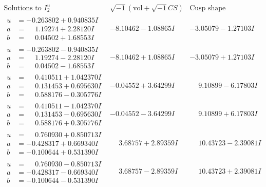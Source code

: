 \documentclass[1p]{elsarticle_modified}
\theoremstyle{definition}
\newcommand{\I}{\sqrt{-1}}
\begin{document}
$$\begin{array}{c|c|c}  
\text{Solutions to }I^u_{2}& \I (\text{vol} + \sqrt{-1}CS) & \text{Cusp shape}\\
 \hline 
\begin{aligned}
u &= -0.263802 + 0.940835 I \\
a &= \phantom{-}1.19274 + 2.28120 I \\
b &= \phantom{-}0.04502 + 1.68553 I\end{aligned}
 & -8.10462 - 1.08865 I & -3.05079 - 1.27103 I \\ \hline\begin{aligned}
u &= -0.263802 - 0.940835 I \\
a &= \phantom{-}1.19274 - 2.28120 I \\
b &= \phantom{-}0.04502 - 1.68553 I\end{aligned}
 & -8.10462 + 1.08865 I & -3.05079 + 1.27103 I \\ \hline\begin{aligned}
u &= \phantom{-}0.410511 + 1.042370 I \\
a &= \phantom{-}0.131453 + 0.695630 I \\
b &= \phantom{-}0.588176 - 0.305776 I\end{aligned}
 & -0.04552 + 3.64299 I & \phantom{-}9.10899 - 6.17803 I \\ \hline\begin{aligned}
u &= \phantom{-}0.410511 - 1.042370 I \\
a &= \phantom{-}0.131453 - 0.695630 I \\
b &= \phantom{-}0.588176 + 0.305776 I\end{aligned}
 & -0.04552 - 3.64299 I & \phantom{-}9.10899 + 6.17803 I \\ \hline\begin{aligned}
u &= \phantom{-}0.760930 + 0.850713 I \\
a &= -0.428317 + 0.669340 I \\
b &= -0.100644 + 0.531390 I\end{aligned}
 & \phantom{-}3.68757 + 2.89359 I & \phantom{-}10.43723 - 2.39081 I \\ \hline\begin{aligned}
u &= \phantom{-}0.760930 - 0.850713 I \\
a &= -0.428317 - 0.669340 I \\
b &= -0.100644 - 0.531390 I\end{aligned}
 & \phantom{-}3.68757 - 2.89359 I & \phantom{-}10.43723 + 2.39081 I \\ \hline\begin{aligned}

\end{aligned}
\end{array}$$
\end{document}
